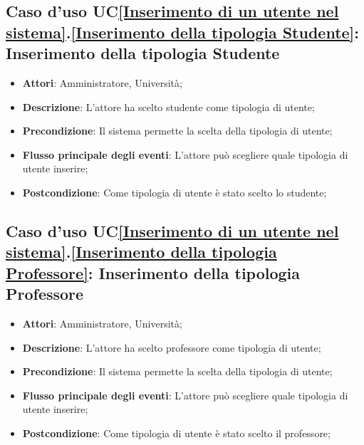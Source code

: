 \subsection{Caso d'uso UC\ref{Inserimento di un utente nel sistema}.\ref{Inserimento della tipologia Studente}: Inserimento della tipologia Studente}
\begin{itemize}
	\item \textbf{Attori}: Amministratore, Università;
	\item \textbf{Descrizione}: L'attore ha scelto studente come tipologia di utente; 
	\item \textbf{Precondizione}: Il sistema permette la scelta della tipologia di utente;
	\item \textbf{Flusso principale degli eventi}: L'attore può scegliere quale tipologia di utente inserire;
	\item \textbf{Postcondizione}: Come tipologia di utente è stato scelto lo studente;
\end{itemize}

\subsection{Caso d'uso UC\ref{Inserimento di un utente nel sistema}.\ref{Inserimento della tipologia Professore}: Inserimento della tipologia Professore}
\begin{itemize}
	\item \textbf{Attori}: Amministratore, Università;
	\item \textbf{Descrizione}: L'attore ha scelto professore come tipologia di utente; 
	\item \textbf{Precondizione}: Il sistema permette la scelta della tipologia di utente;
	\item \textbf{Flusso principale degli eventi}: L'attore può scegliere quale tipologia di utente inserire;
	\item \textbf{Postcondizione}: Come tipologia di utente è stato scelto il professore;
\end{itemize}

